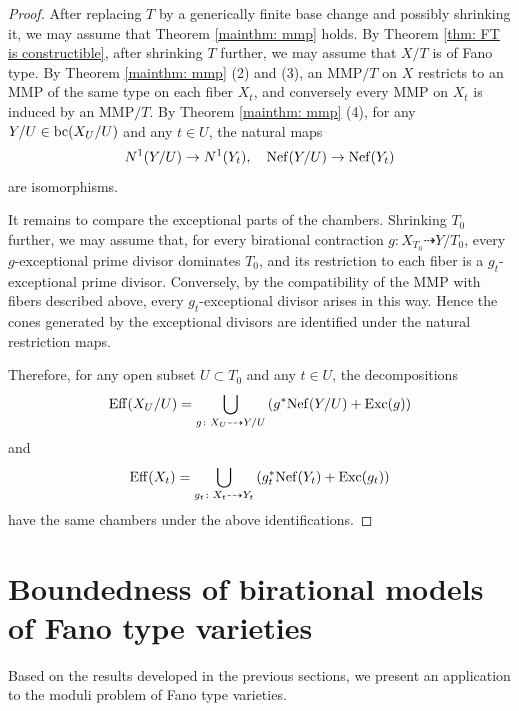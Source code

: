 \documentclass[11pt,oneside,reqno]{amsart}
\numberwithin{equation}{section}
\theoremstyle{definition}
\newcommand{\Exc}{{\rm {Exc}}}
\newcommand{\Nef}{{\rm {Nef}}}
\newcommand{\Eff}{{\rm {Eff}}}
\newcommand{\bc}{{\rm {bc}}}
\begin{document}
\begin{proof}
After replacing $T$ by a generically finite base change and possibly shrinking
it, we may assume that Theorem \ref{mainthm: mmp} holds. By Theorem
\ref{thm: FT is constructible}, after shrinking $T$ further, we may assume that
$X/T$ is of Fano type. By Theorem \ref{mainthm: mmp} (2) and (3), an MMP$/T$ on $X$ restricts to an
MMP of the same type on each fiber $X_t$, and conversely every MMP on $X_t$ is
induced by an MMP$/T$. By Theorem
\ref{mainthm: mmp} (4), for any $Y/U\in \bc(X_U/U)$ and any $t\in U$, the
natural maps
\[
N^1(Y/U) \to N^1(Y_t), \quad
\Nef(Y/U) \to \Nef(Y_t)
\]
are isomorphisms.

It remains to compare the exceptional parts of the chambers. Shrinking $T_0$
further, we may assume that, for every birational contraction
$g\colon X_{T_0}\dashrightarrow Y/T_0$, every $g$-exceptional prime divisor
dominates $T_0$, and its restriction to each fiber is a $g_t$-exceptional
prime divisor. Conversely, by the compatibility of the MMP with fibers
described above, every $g_t$-exceptional divisor arises in this way. Hence the
cones generated by the exceptional divisors are identified under the natural
restriction maps.

Therefore, for any open subset $U\subset T_0$ and any $t\in U$, the
decompositions
\[
\Eff(X_U/U)
=
\bigcup_{g\colon X_U\dashrightarrow Y/U}
\left(g^*\Nef(Y/U)+\Exc(g)\right)
\]
and
\[
\Eff(X_t)
=
\bigcup_{g_t\colon X_t\dashrightarrow Y_t}
\left(g_t^*\Nef(Y_t)+\Exc(g_t)\right)
\]
have the same chambers under the above identifications.
\end{proof}

\section{Boundedness of birational models of Fano type varieties}\label{sec: bdd FT}

Based on the results developed in the previous sections, we present an application to the moduli problem of Fano type varieties. 
\end{document}
